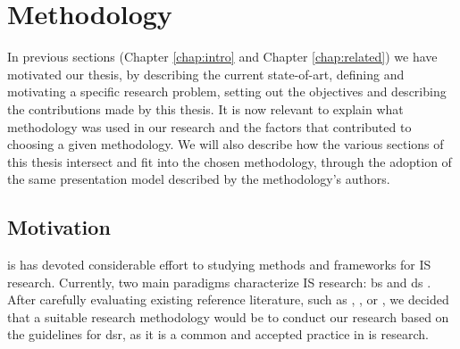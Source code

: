 \chapter{Methodology}
\label{chap:methods}

In previous sections (Chapter \ref{chap:intro} and Chapter \ref{chap:related}) we have motivated our thesis, by describing the current state-of-art, defining and motivating a specific research problem, setting out the objectives and describing the contributions made by this thesis. It is now relevant to explain what methodology was used in our research and the factors that contributed to choosing a given methodology. We will also describe how the various sections of this thesis intersect and fit into the chosen methodology, through the adoption of the same presentation model described by the methodology's authors.

\section{Motivation}

\gls{is} has devoted considerable effort to studying methods and frameworks for IS research. Currently, two main paradigms characterize IS research: \gls{bs} and \gls{ds} \cite[76]{hevner_design_2004}. After carefully evaluating existing reference literature, such as \cite{hevner_design_2004}, \cite{march_design_1995}, \cite{winter_design_2008} or \cite{peffers_design_2007}, we decided that a suitable research methodology would be to conduct our research based on the guidelines for \gls{dsr}, as it is a common and accepted practice in \gls{is} research. 

